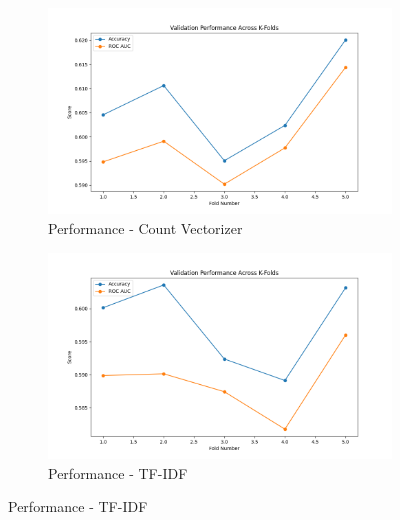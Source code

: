 \begin{figure}[H]
    \centering
    \begin{subfigure}[b]{0.44\textwidth}
        \includegraphics[width=\textwidth]{img/report_info/img/1.2.DecisionTree/best_decision_tree_count.png}
        \caption{Performance - Count Vectorizer}
        \label{fig:lr-count}
    \end{subfigure}
    \begin{subfigure}[b]{0.44\textwidth}
        \includegraphics[width=\textwidth]{img/report_info/img/1.2.DecisionTree/best_decision_tree_tfidf.png}
        \caption{Performance - TF-IDF}
        \label{fig:lr-tfidf}
    \end{subfigure}
    

\end{figure}
